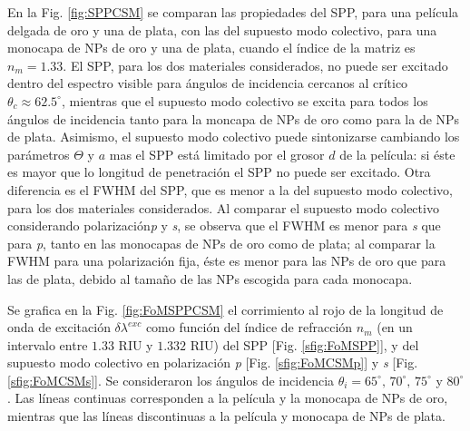 En la Fig. \ref{fig:SPPCSM} se comparan las propiedades del SPP, para una película delgada de oro y una de plata, con las del supuesto modo colectivo, para una monocapa de NPs de oro y una de plata, cuando el índice de la matriz es $n_m=1.33$. El SPP, para los dos materiales considerados, no puede ser excitado dentro del espectro visible para ángulos de incidencia cercanos al crítico $\theta_c\approx 62.5^\circ$, mientras que el supuesto modo colectivo se excita para todos los ángulos de incidencia tanto para la moncapa de NPs de oro como para la de NPs de plata. Asimismo, el supuesto modo colectivo puede sintonizarse  cambiando los parámetros $\Theta$ y $a$ mas el SPP está limitado por el grosor $d$ de la película: si éste es mayor que lo longitud de penetración el SPP no puede ser excitado. Otra diferencia es el FWHM del SPP, que es menor a la del supuesto modo colectivo, para los dos materiales considerados. Al comparar el supuesto modo colectivo considerando polarización\emph{p} y \emph{s},  se observa  que el FWHM es menor para \emph{s} que para \emph{p}, tanto en las monocapas de NPs de oro como de plata; al comparar la FWHM para una polarización fija, éste es menor para las NPs de oro que para las de plata, debido al tamaño de las NPs escogida para cada monocapa.

Se grafica en la Fig. \ref{fig:FoMSPPCSM} el corrimiento al rojo de la longitud de onda de excitación $\delta\lambda^{exc}$ como función del índice de refracción $n_m$ (en un intervalo entre $1.33$ RIU y $1.332$ RIU)  del SPP [Fig. \ref{sfig:FoMSPP}], y del supuesto modo colectivo en polarización \emph{p} [Fig. \ref{sfig:FoMCSMp}] y \emph{s} [Fig. \ref{sfig:FoMCSMs}]. Se consideraron los ángulos de incidencia $\theta_i=65^\circ,\, 70^\circ,\, 75^\circ$ y $80^\circ$. Las líneas continuas corresponden a la película y la monocapa de NPs de oro, mientras que las líneas discontinuas a la película y monocapa de NPs de plata. 


